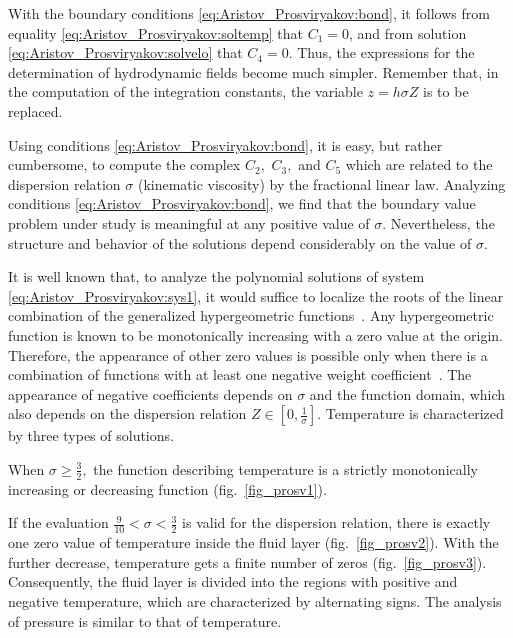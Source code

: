 With the boundary conditions \eqref{eq:Aristov_Prosviryakov:bond}, it follows from equality \eqref{eq:Aristov_Prosviryakov:soltemp} that  $C_1=0$, and from solution \eqref{eq:Aristov_Prosviryakov:solvelo} that  $C_4=0$. Thus, the expressions for the determination of hydrodynamic fields become much simpler. Remember that, in the computation of the integration constants, the variable $z=h\sigma Z$  is to be replaced.












 Using conditions \eqref{eq:Aristov_Prosviryakov:bond}, it is easy, but rather cumbersome, to compute the complex  $C_2,$ $C_3,$ and $C_5$  which are related to the dispersion relation   $\sigma$ (kinematic viscosity) by the fractional linear law. Analyzing conditions \eqref{eq:Aristov_Prosviryakov:bond}, we find that the boundary value problem under study is meaningful at any positive value of  $\sigma.$ Nevertheless, the structure and behavior of the solutions depend considerably on the value of  $\sigma.$



It is well known that, to analyze the polynomial solutions of system \eqref{eq:Aristov_Prosviryakov:sys1}, it would suffice to localize the roots of the linear combination of the generalized hypergeometric functions~\cite{ulg:bib:Polyanin}. Any hypergeometric function is known to be monotonically increasing with a zero value at the origin. Therefore, the appearance of other zero values is possible only when there is a combination of functions with at least one negative weight coefficient~\cite{ulg:bib:Polyanin}. The appearance of negative coefficients depends on $\sigma$  and the function domain, which also depends on the dispersion relation $Z\in\left[0, \frac{1}{\sigma}\right].$  Temperature is characterized by three types of solutions. 

When  $\sigma\geq\frac{3}{2},$ the function describing temperature is a strictly monotonically increasing or decreasing function (fig.~\ref{fig_prosv1}). 

If the evaluation  $\frac{9}{10}<\sigma<\frac{3}{2}$  is valid for the dispersion relation, there is exactly one zero value of temperature inside the fluid layer (fig.~\ref{fig_prosv2}). With the further decrease, temperature gets a finite number of zeros (fig.~\ref{fig_prosv3}). Consequently, the fluid layer is divided into the regions with positive and negative temperature, which are characterized by alternating signs. The analysis of pressure is similar to that of temperature. 





